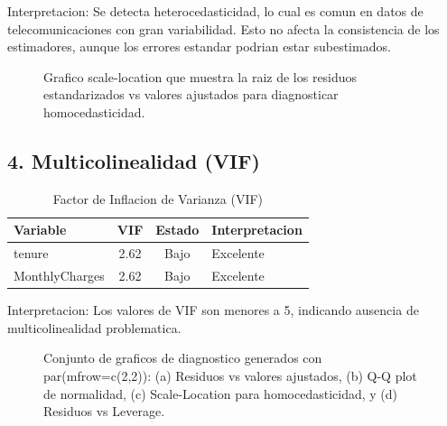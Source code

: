 \documentclass[12pt,a4paper]{article}
\begin{document}
Interpretacion: Se detecta heterocedasticidad, lo cual es comun en datos de telecomunicaciones con gran variabilidad. Esto no afecta la consistencia de los estimadores, aunque los errores estandar podrian estar subestimados.

\begin{figure}[H]
    \centering
    \caption{Grafico scale-location que muestra la raiz de los residuos estandarizados vs valores ajustados para diagnosticar homocedasticidad.}
    \label{fig:scalelocation}
\end{figure}

\subsection{4. Multicolinealidad (VIF)}

\begin{table}[H]
\centering
\caption{Factor de Inflacion de Varianza (VIF)}
\begin{tabular}{lccl}
\toprule
\textbf{Variable} & \textbf{VIF} & \textbf{Estado} & \textbf{Interpretacion} \\
\midrule
tenure & 2.62 & Bajo & Excelente \\
MonthlyCharges & 2.62 & Bajo & Excelente \\
\bottomrule
\end{tabular}
\end{table}

Interpretacion: Los valores de VIF son menores a 5, indicando ausencia de multicolinealidad problematica.

\begin{figure}[H]
    \centering
    \caption{Conjunto de graficos de diagnostico generados con par(mfrow=c(2,2)): (a) Residuos vs valores ajustados, (b) Q-Q plot de normalidad, (c) Scale-Location para homocedasticidad, y (d) Residuos vs Leverage.}
    \label{fig:diagnostico}
\end{figure}
\end{document}
